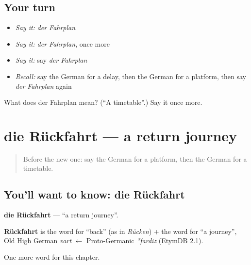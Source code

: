 \subsection*{Your turn}
\begin{itemize}
\raggedright
  \item \emph{Say it:} \emph{der Fahrplan}
  \item \emph{Say it:} \emph{der Fahrplan}, once more
  \item \emph{Say it:} say \emph{der Fahrplan}
  \item \emph{Recall:} say the German for a delay, then the German for a platform, then say \emph{der Fahrplan} again
\end{itemize}

\begin{tcolorbox}[breakable,colback=teal!4,colframe=teal!35!black,title={Before you move on}]
What does der Fahrplan mean? (\textquotedblleft{}A timetable\textquotedblright{}.) Say it once more.
\end{tcolorbox}
\section[die Rückfahrt]{die Rückfahrt — a return journey}

\label{lesson:GE-C193-rueckfahrt}



\begin{quote}
Before the new one: say the German for a platform, then the German for a timetable.
\end{quote}

\subsection*{You'll want to know: die Rückfahrt}
\textbf{die Rückfahrt} — \textquotedblleft{}a return journey\textquotedblright{}.

\begin{cousinweb}
\textbf{Rückfahrt} is the word for \textquotedblleft{}back\textquotedblright{} (as in \emph{Rücken}) + the word for \textquotedblleft{}a journey\textquotedblright{}, Old High German \emph{vart} $\leftarrow$ Proto-Germanic \emph{*fardiz} (EtymDB 2.1).
\end{cousinweb}

\begin{grammarlens}[title={What you've built}]
One more word for this chapter.
\end{grammarlens}

